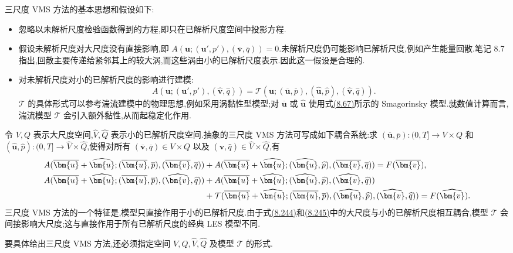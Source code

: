 \begin{note}
三尺度 VMS 方法的基本思想和假设如下:
\begin{itemize}
\item 忽略以未解析尺度检验函数得到的方程,即只在已解析尺度空间中投影方程.
\item 假设未解析尺度对大尺度没有直接影响,即
 $A(\bm{u};(\bm{u}',p'),(\overline{\bm{v}},\overline q))=0$.未解析尺度仍可能影响已解析尺度,例如产生能量回散.笔记 8.7 指出,回散主要传递给紧邻其上的较大涡,而这些涡由小的已解析尺度表示.因此这一假设是合理的.
\item 对未解析尺度对小的已解析尺度的影响进行建模:
\[
 A(\bm{u};(\bm{u}',p'),(\widehat{\bm{v}},\widehat q))
 =\mathcal{T}(\bm{u};(\overline{\bm{u}},\overline p),
          (\widehat{\bm{u}},\widehat p),
          (\widehat{\bm{v}},\widehat q)).
\]
 $\mathcal{T}$ 的具体形式可以参考湍流建模中的物理思想,例如采用涡黏性型模型;对 $\overline{\bm{u}}$ 或 $\widehat{\bm{u}}$ 使用式\hyperref[eq:smagorinsky-filter-width]{(8.67)}所示的 Smagorinsky 模型.就数值计算而言,湍流模型 $\mathcal{T}$ 会引入额外黏性,从而起稳定化作用.
\end{itemize}

令 $V,Q$ 表示大尺度空间,$\widehat V,\widehat Q$ 表示小的已解析尺度空间.抽象的三尺度 VMS 方法可写成如下耦合系统:求
$(\overline{\bm{u}},\overline p):(0,T]\to V\times Q$ 和
$(\widehat{\bm{u}},\widehat p):(0,T]\to\widehat V\times\widehat Q$,使得对所有
$(\overline{\bm{v}},\overline q)\in V\times Q$ 以及
$(\widehat{\bm{v}},\widehat q)\in\widehat V\times\widehat Q$,有
\begin{align}
 A(\overline{\bm{u}}+\widehat{\bm{u}};
   (\overline{\bm{u}},\overline p),
   (\overline{\bm{v}},\overline q))
 &+A(\overline{\bm{u}}+\widehat{\bm{u}};
   (\widehat{\bm{u}},\widehat p),
   (\overline{\bm{v}},\overline q))
 =F(\overline{\bm{v}}),\label{eq:vms-three-scale-model-large}\\
 A(\overline{\bm{u}}+\widehat{\bm{u}};
   (\overline{\bm{u}},\overline p),
   (\widehat{\bm{v}},\widehat q))
 &+A(\overline{\bm{u}}+\widehat{\bm{u}};
   (\widehat{\bm{u}},\widehat p),
   (\widehat{\bm{v}},\widehat q))\notag\\
 &+\mathcal{T}(\overline{\bm{u}}+\widehat{\bm{u}};
   (\overline{\bm{u}},\overline p),
   (\widehat{\bm{u}},\widehat p),
   (\widehat{\bm{v}},\widehat q))
 =F(\widehat{\bm{v}}).\label{eq:vms-three-scale-model-small}
\end{align}
三尺度 VMS 方法的一个特征是,模型只直接作用于小的已解析尺度.由于式\hyperref[eq:vms-three-scale-model-large]{(8.244)}和\hyperref[eq:vms-three-scale-model-small]{(8.245)}中的大尺度与小的已解析尺度相互耦合,模型 $\mathcal{T}$ 会间接影响大尺度;这与直接作用于所有已解析尺度的经典 LES 模型不同.

要具体给出三尺度 VMS 方法,还必须指定空间 $V,Q,\widehat V,\widehat Q$ 及模型 $\mathcal{T}$ 的形式.
\end{note}


